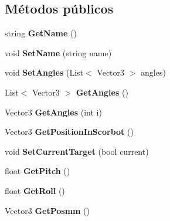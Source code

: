 \subsection*{Métodos públicos}
\begin{DoxyCompactItemize}
\item 
\mbox{\label{class_target_model_a3f08aa61678b55ad41acc59c9d4f4f9c}} 
string {\bfseries Get\+Name} ()
\item 
\mbox{\label{class_target_model_a056e89cd27d78b4d7d024d8bc4d0d3cd}} 
void {\bfseries Set\+Name} (string name)
\item 
\mbox{\label{class_target_model_a36babf52c1f4e545e7db883cb66fbce5}} 
void {\bfseries Set\+Angles} (List$<$ Vector3 $>$ angles)
\item 
\mbox{\label{class_target_model_a6e50c4236edc8efc587238ccfdf90c7e}} 
List$<$ Vector3 $>$ {\bfseries Get\+Angles} ()
\item 
\mbox{\label{class_target_model_a8234e7f5a9811ba3b72ec74de2a38926}} 
Vector3 {\bfseries Get\+Angles} (int i)
\item 
\mbox{\label{class_target_model_a17e1641d07e21286f6699f4b2b39fef5}} 
Vector3 {\bfseries Get\+Position\+In\+Scorbot} ()
\item 
\mbox{\label{class_target_model_a1f82c9cde211b28154e072c7873994d9}} 
void {\bfseries Set\+Current\+Target} (bool current)
\item 
\mbox{\label{class_target_model_a5b6b7410ef505df9da09279ab341eceb}} 
float {\bfseries Get\+Pitch} ()
\item 
\mbox{\label{class_target_model_a8cd198c6d6a066183432127e2dc68390}} 
float {\bfseries Get\+Roll} ()
\item 
\mbox{\label{class_target_model_aba4adc27a65f129a822811333d30eec0}} 
Vector3 {\bfseries Get\+Posmm} ()
\item 
\mbox{\label{class_target_model_ad3bc453cd76840108e7b7ffdd783c175}} 

\end{DoxyCompactItemize}
